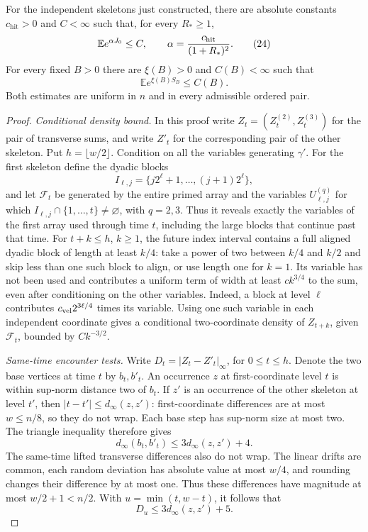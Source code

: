 \begin{lemma}\label{lem:skeleton}
For the independent skeletons just constructed, there are absolute
constants $c_{\mathrm{hit}}>0$ and $C<\infty$ such that, for every
$R_*\ge1$,
\[
             \mathbb E e^{\alpha J_0}\le C,\qquad
             \alpha=\frac{c_{\rm hit}}{(1+R_*)^2}.
             \tag{24}\label{eq:24}
\]
For every fixed $B>0$ there are $\xi(B)>0$ and $C(B)<\infty$ such that
\[
             \mathbb E e^{\xi(B)S_B}\le C(B).
             \tag{25}\label{eq:25}
\]
Both estimates are uniform in $n$ and in every admissible ordered pair.
\end{lemma}
\begin{proof}
\emph{Conditional density bound.}
In this proof write
\(Z_t=(Z_t^{(2)},Z_t^{(3)})\) for the pair of transverse sums,
and write \(Z'_t\) for the corresponding pair of the other skeleton.
Put \(h=\lfloor w/2\rfloor\). Condition on all the variables
generating \(\gamma'\). For the first skeleton define the dyadic blocks
\[
 I_{\ell,j}=\{j2^\ell+1,\ldots,(j+1)2^\ell\},
\]
and let \(\mathcal F_t\) be generated by the entire primed array and
the variables \(U^{(q)}_{\ell,j}\) for which
\(I_{\ell,j}\cap\{1,\ldots,t\}\ne\varnothing\), with \(q=2,3\).
Thus it reveals exactly the variables of the first array used through time
\(t\), including the large blocks that continue past that time.
For \(t+k\le h\), \(k\ge1\), the future index interval contains
a full aligned dyadic block of length at least \(k/4\): take a
power of two between \(k/4\) and \(k/2\) and skip less than one
such block to align, or use length one for \(k=1\). Its variable
has not been used and contributes a uniform term of width at least
\(c k^{3/4}\) to the sum, even after conditioning on the other
variables. Indeed, a block at level \(\ell\) contributes
\(c_{\rm vel}2^{3\ell/4}\) times its variable. Using one such
variable in each independent coordinate gives a conditional
two-coordinate density of \(Z_{t+k}\), given \(\mathcal F_t\),
bounded by \(Ck^{-3/2}\).

\emph{Same-time encounter tests.}
Write \(D_t=|Z_t-Z'_t|_\infty\), for \(0\le t\le h\).
Denote the two base vertices at time \(t\) by \(b_t,b'_t\).
An occurrence \(z\) at first-coordinate level \(t\) is within
sup-norm distance two of \(b_t\). If \(z'\) is an occurrence of
the other skeleton at level \(t'\), then
\( |t-t'|\le d_\infty(z,z')\): first-coordinate differences
are at most \(w\le n/8\), so they do not wrap. Each base step
has sup-norm size at most two. The triangle inequality therefore gives
\[
 d_\infty(b_t,b'_t)\le 3d_\infty(z,z')+4.
\]
The same-time lifted transverse differences also do not wrap.
The linear drifts are common, each random deviation has absolute
value at most \(w/4\), and rounding changes their difference by
at most one. Thus these differences have magnitude at most
\(w/2+1<n/2\). With \(u=\min(t,w-t)\), it follows that
\[
 D_u\le 3d_\infty(z,z')+5.
\]


\end{proof}
